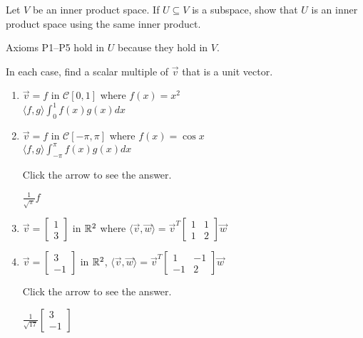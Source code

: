 \documentclass{ximera}
\begin{document}
\begin{problem}\label{prob:inner_prod_2}
Let $V$ be an inner product space. If $U \subseteq V$ is a subspace, show that $U$ is an inner product space using the same inner product.

\begin{hint}
Axioms P1--P5 hold in $U$ because they hold in $V$.
\end{hint}
\end{problem}

\begin{problem}\label{prob:inner_prod_3}
In each case, find a scalar multiple of $\vec{v}$ that is a unit vector.

\begin{enumerate} 
\item $\vec{v} = f$ in $\mathcal{C}[0, 1]$ where
$f(x) = x^2$  \\ $\langle f, g \rangle \int_{0}^{1} f(x)g(x)dx$

\item $\vec{v} = f$ in $\mathcal{C}[-\pi, \pi]$ where
$f(x) = \cos x$ \\ $\langle f, g \rangle \int_{-\pi}^{\pi} f(x)g(x)dx$

Click the arrow to see the answer.
\begin{expandable}
$\frac{1}{\sqrt{\pi}}f$
\end{expandable}

\item $\vec{v} =
\left[ \begin{array}{r}
1 \\
3
\end{array} \right]$
in $\mathbb{R}^2$ where $\langle \vec{v}, \vec{w} \rangle = \vec{v}^T
\left[ \begin{array}{rr}
1 & 1 \\
1 & 2
\end{array} \right]
\vec{w}$

\item $ \vec{v} =
\left[ \begin{array}{r}
3 \\
-1
\end{array} \right]$
in $\mathbb{R}^2$, $\langle \vec{v}, \vec{w} \rangle = \vec{v}^T
\left[ \begin{array}{rr}
1 & -1 \\
-1 & 2
\end{array} \right]
\vec{w}$

Click the arrow to see the answer.
\begin{expandable}
$\frac{1}{\sqrt{17}}
\left[ \begin{array}{r}
3 \\
-1
\end{array} \right]$
\end{expandable}

\end{enumerate}
\end{problem}
\end{document}
